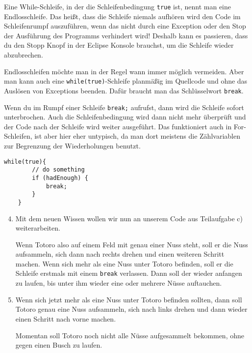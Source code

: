 \begin{Infobox}
	Eine While-Schleife, in der die Schleifenbedingung \lstinline{true} ist, nennt man eine Endlosschleife.
	Das heißt, dass die Schleife niemals aufhören wird den Code im Schleifenrumpf auszuführen, wenn das nicht durch eine Exception oder den Stop der Ausführung des Programms verhindert wird!
	Deshalb kann es passieren, dass du den Stopp Knopf in der Eclipse Konsole brauchst, um die Schleife wieder abzubrechen.\newline

	Endlosschleifen möchte man in der Regel wann immer möglich vermeiden.
	Aber man kann auch eine \lstinline{while(true)}-Schleife planmäßig im Quellcode und ohne das Auslösen von Exceptions beenden.
	Dafür braucht man das Schlüsselwort \lstinline{break}.\newline

	Wenn du im Rumpf einer Schleife \lstinline{break;} aufrufst, dann wird die Schleife sofort unterbrochen.
	Auch die Schleifenbedingung wird dann nicht mehr überprüft und der Code nach der Schleife wird weiter ausgeführt.
	Das funktioniert auch in For-Schleifen, ist aber hier eher untypisch, da man dort meistens die Zählvariablen zur Begrenzung der Wiederholungen benutzt.

	\begin{lstlisting}[numbers=none]
	while(true){
		// do something
		if (hadEnough) {
			break;
		}
	}
	\end{lstlisting}

\end{Infobox}


\begin{enumerate}\setcounter{enumi}{3}
	\item
	Mit dem neuen Wissen wollen wir nun an unserem Code aus Teilaufgabe c) weiterarbeiten.

	Wenn Totoro also auf einem Feld mit genau einer Nuss steht, soll er die Nuss aufsammeln, sich dann nach rechts drehen und einen weiteren Schritt machen.
	Wenn sich mehr als eine Nuss unter Totoro befinden, soll er die Schleife erstmals mit einem \lstinline{break} verlassen.
	Dann soll der wieder anfangen zu laufen, bis unter ihm wieder eine oder mehrere Nüsse auftauchen.
	
	\item
	Wenn sich jetzt mehr als eine Nuss unter Totoro befinden sollten, dann soll Totoro genau eine Nuss aufsammeln, sich nach links drehen und dann wieder einen Schritt nach vorne machen.
	
	Momentan soll Totoro noch nicht alle Nüsse aufgesammelt bekommen, ohne gegen einen Busch zu laufen.
	\end{enumerate}
	
